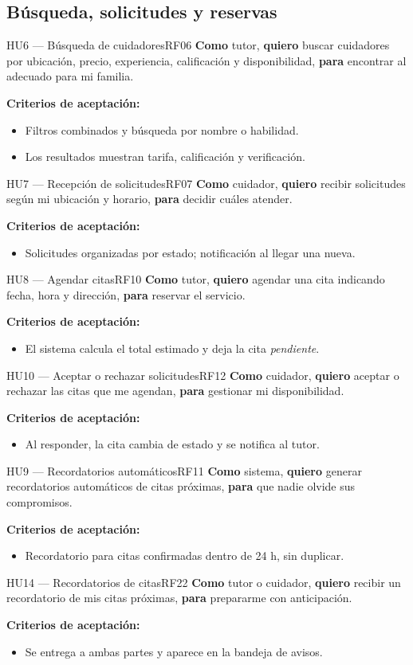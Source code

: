\documentclass[11pt,a4paper]{article}
\newcommand{\rqp}[3]{%
  \textbf{Como} #1, \textbf{quiero} #2, \textbf{para} #3.\par\vspace{4pt}
  \textbf{\color{guindaDark}Criterios de aceptación:}}
\begin{document}
\subsection{Búsqueda, solicitudes y reservas}
\begin{hu}{HU6 — Búsqueda de cuidadores}{RF06}
\rqp{tutor}{buscar cuidadores por ubicación, precio, experiencia, calificación y disponibilidad}{encontrar al adecuado para mi familia}
\begin{itemize}
  \item Filtros combinados y búsqueda por nombre o habilidad.
  \item Los resultados muestran tarifa, calificación y verificación.
\end{itemize}
\end{hu}
\begin{hu}{HU7 — Recepción de solicitudes}{RF07}
\rqp{cuidador}{recibir solicitudes según mi ubicación y horario}{decidir cuáles atender}
\begin{itemize}
  \item Solicitudes organizadas por estado; notificación al llegar una nueva.
\end{itemize}
\end{hu}
\begin{hu}{HU8 — Agendar citas}{RF10}
\rqp{tutor}{agendar una cita indicando fecha, hora y dirección}{reservar el servicio}
\begin{itemize}
  \item El sistema calcula el total estimado y deja la cita \emph{pendiente}.
\end{itemize}
\end{hu}
\begin{hu}{HU10 — Aceptar o rechazar solicitudes}{RF12}
\rqp{cuidador}{aceptar o rechazar las citas que me agendan}{gestionar mi disponibilidad}
\begin{itemize}
  \item Al responder, la cita cambia de estado y se notifica al tutor.
\end{itemize}
\end{hu}
\begin{hu}{HU9 — Recordatorios automáticos}{RF11}
\rqp{sistema}{generar recordatorios automáticos de citas próximas}{que nadie olvide sus compromisos}
\begin{itemize}
  \item Recordatorio para citas confirmadas dentro de 24 h, sin duplicar.
\end{itemize}
\end{hu}
\begin{hu}{HU14 — Recordatorios de citas}{RF22}
\rqp{tutor o cuidador}{recibir un recordatorio de mis citas próximas}{prepararme con anticipación}
\begin{itemize}
  \item Se entrega a ambas partes y aparece en la bandeja de avisos.
\end{itemize}
\end{hu}
\end{document}
